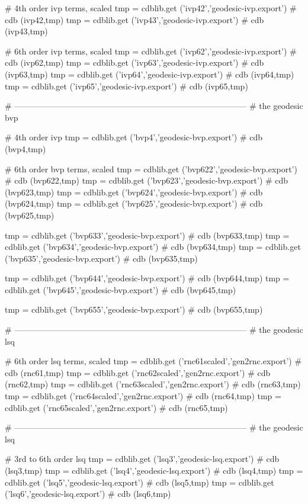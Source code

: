 \documentclass[12pt]{cdblatex}
\begin{document}
\begin{cadabra}
   # 4th order ivp terms, scaled
   tmp = cdblib.get ('ivp42','geodesic-ivp.export')  # cdb (ivp42,tmp)
   tmp = cdblib.get ('ivp43','geodesic-ivp.export')  # cdb (ivp43,tmp)

   # 6th order ivp terms, scaled
   tmp = cdblib.get ('ivp62','geodesic-ivp.export')  # cdb (ivp62,tmp)
   tmp = cdblib.get ('ivp63','geodesic-ivp.export')  # cdb (ivp63,tmp)
   tmp = cdblib.get ('ivp64','geodesic-ivp.export')  # cdb (ivp64,tmp)
   tmp = cdblib.get ('ivp65','geodesic-ivp.export')  # cdb (ivp65,tmp)

   # ------------------------------------------------------------------------------------
   # the geodesic bvp

   # 4th order ivp
   tmp = cdblib.get ('bvp4','geodesic-bvp.export')  # cdb (bvp4,tmp)

   # 6th order bvp terms, scaled
   tmp = cdblib.get ('bvp622','geodesic-bvp.export')  # cdb (bvp622,tmp)
   tmp = cdblib.get ('bvp623','geodesic-bvp.export')  # cdb (bvp623,tmp)
   tmp = cdblib.get ('bvp624','geodesic-bvp.export')  # cdb (bvp624,tmp)
   tmp = cdblib.get ('bvp625','geodesic-bvp.export')  # cdb (bvp625,tmp)

   tmp = cdblib.get ('bvp633','geodesic-bvp.export')  # cdb (bvp633,tmp)
   tmp = cdblib.get ('bvp634','geodesic-bvp.export')  # cdb (bvp634,tmp)
   tmp = cdblib.get ('bvp635','geodesic-bvp.export')  # cdb (bvp635,tmp)

   tmp = cdblib.get ('bvp644','geodesic-bvp.export')  # cdb (bvp644,tmp)
   tmp = cdblib.get ('bvp645','geodesic-bvp.export')  # cdb (bvp645,tmp)

   tmp = cdblib.get ('bvp655','geodesic-bvp.export')  # cdb (bvp655,tmp)

   # ------------------------------------------------------------------------------------
   # the geodesic lsq

   # 6th order lsq terms, scaled
   tmp = cdblib.get ('rnc61scaled','gen2rnc.export')  # cdb (rnc61,tmp)
   tmp = cdblib.get ('rnc62scaled','gen2rnc.export')  # cdb (rnc62,tmp)
   tmp = cdblib.get ('rnc63scaled','gen2rnc.export')  # cdb (rnc63,tmp)
   tmp = cdblib.get ('rnc64scaled','gen2rnc.export')  # cdb (rnc64,tmp)
   tmp = cdblib.get ('rnc65scaled','gen2rnc.export')  # cdb (rnc65,tmp)

   # ------------------------------------------------------------------------------------
   # the geodesic lsq

   # 3rd to 6th order lsq
   tmp = cdblib.get ('lsq3','geodesic-lsq.export')  # cdb (lsq3,tmp)
   tmp = cdblib.get ('lsq4','geodesic-lsq.export')  # cdb (lsq4,tmp)
   tmp = cdblib.get ('lsq5','geodesic-lsq.export')  # cdb (lsq5,tmp)
   tmp = cdblib.get ('lsq6','geodesic-lsq.export')  # cdb (lsq6,tmp)


\end{cadabra}
\end{document}
